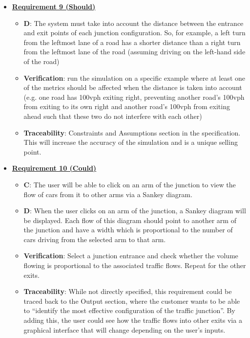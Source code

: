 \documentclass{article}
\begin{document}
\begin{itemize}
    \item \textbf{\underline{Requirement 9 (Should)}}
    \begin{itemize}
        \item \textbf{D}: The system must take into account the distance between the entrance and exit 
            points of each junction configuration. So, for example, a left turn from the 
            leftmost lane of a road has a shorter distance than a right turn from the leftmost 
            lane of the road (assuming driving on the left-hand side of the road)
        \item \textbf{Verification}: run the simulation on a specific example where at least one of 
            the metrics should be affected when the distance is taken into account (e.g. one 
            road has 100vph exiting right, preventing another road’s 100vph from exiting to its
            own right and another road’s 100vph from exiting ahead such that these two do not 
            interfere with each other)
        \item\textbf{Traceability}: Constraints and Assumptions section in the specification. 
            This will increase the accuracy of the simulation and is a unique selling point.
    \end{itemize}

    \item \textbf{\underline{Requirement 10 (Could)}}
    \begin{itemize}
        \item \textbf{C}: The user will be able to click on an arm of the junction to view the flow of cars 
            from it to other arms via a Sankey diagram.
        \item \textbf{D}: When the user clicks on an arm of the junction, a Sankey diagram will be displayed. 
            Each flow of this diagram should point to another arm of the junction and have a width which is 
            proportional to the number of cars driving from the selected arm to that arm.
        \item \textbf{Verification}: Select a junction entrance and check whether the volume flowing
            is proportional to the associated traffic flows. Repeat for the other exits.
        \item\textbf{Traceability}: While not directly specified, this requirement could be traced back 
            to the Output section, where the customer wants to be able to “identify the most effective 
            configuration of the traffic junction”. By adding this, the user could see how the traffic 
            flows into other exits via a graphical interface that will change depending on the user's 
            inputs.
    \end{itemize}


\end{itemize}
\end{document}
